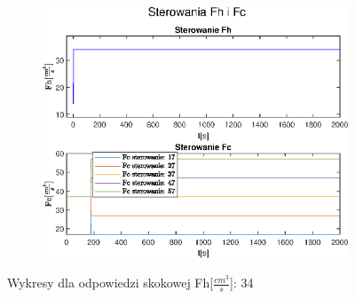 \begin{figure}[h!]
   \begin{subfigure}[b]{0.6\textwidth}
      \includegraphics[width=1\linewidth]{img/step-responses/stepResponseU34.eps}
      \caption{}
      \label{fig:fig:stepResponsesFh343}
   \end{subfigure}
       
   \caption{Wykresy dla odpowiedzi skokowej Fh[$\frac{cm^3}{s}$]: 34}
   \label{fig:stepResponsesFh34}
\end{figure}
           
